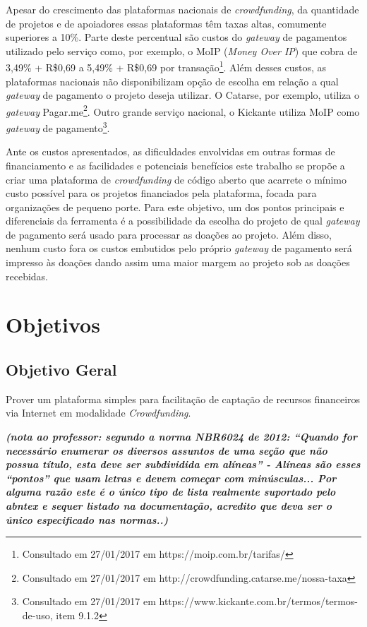 Apesar do crescimento das plataformas nacionais de \emph{crowdfunding}, da quantidade de projetos e de apoiadores essas plataformas têm taxas altas, comumente superiores a 10\%. Parte deste percentual são custos do \emph{gateway} de pagamentos utilizado pelo serviço como, por exemplo, o MoIP (\emph{Money Over IP}) que cobra de 3,49\% + R\$0,69 a 5,49\% + R\$0,69 por transação\footnote{Consultado em 27/01/2017 em https://moip.com.br/tarifas/}. Além desses custos, as plataformas nacionais não disponibilizam opção de escolha em relação a qual \emph{gateway} de pagamento o projeto deseja utilizar. O Catarse, por exemplo, utiliza o \emph{gateway} Pagar.me\footnote{Consultado em 27/01/2017 em http://crowdfunding.catarse.me/nossa-taxa}. Outro grande serviço nacional, o Kickante utiliza MoIP como \emph{gateway} de pagamento\footnote{Consultado em 27/01/2017 em https://www.kickante.com.br/termos/termos-de-uso, item 9.1.2}.

Ante os custos apresentados, as dificuldades envolvidas em outras formas de financiamento e as facilidades e potenciais benefícios este trabalho se propõe a criar uma plataforma de \emph{crowdfunding} de código aberto que acarrete o mínimo custo possível para os projetos financiados pela plataforma, focada para organizações de pequeno porte. Para este objetivo, um dos pontos principais e diferenciais da ferramenta é a possibilidade da escolha do projeto de qual \emph{gateway} de pagamento será usado para processar as doações ao projeto. Além disso, nenhum custo fora os custos embutidos pelo próprio \emph{gateway} de pagamento será impresso às doações dando assim uma maior margem ao projeto sob as doações recebidas.



\section{Objetivos}
\subsection{Objetivo Geral}
Prover um plataforma simples para facilitação de captação de recursos financeiros via Internet em modalidade \emph{Crowdfunding}.

\textbf{\textit{(nota ao professor: segundo a norma NBR6024 de 2012: ``Quando for necessário enumerar os diversos assuntos de uma seção que não possua título, esta deve ser subdividida em alíneas'' - Alíneas são esses ``pontos'' que usam letras e devem começar com minúsculas... Por alguma razão este é o único tipo de lista realmente suportado pelo abntex e sequer listado na documentação, acredito que deva ser o único especificado nas normas..)}}

